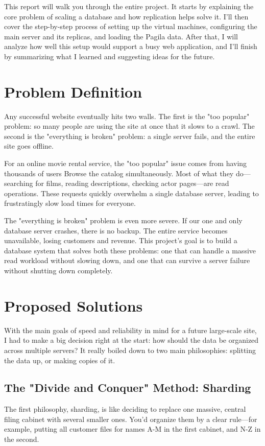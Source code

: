 \documentclass[conference]{IEEEtran}
\begin{document}
This report will walk you through the entire project. It starts by explaining the core problem of scaling a database and how replication helps solve it. I'll then cover the step-by-step process of setting up the virtual machines, configuring the main server and its replicas, and loading the Pagila data. After that, I will analyze how well this setup would support a busy web application, and I'll finish by summarizing what I learned and suggesting ideas for the future.
\section{Problem Definition}
Any successful website eventually hits two walls. The first is the "too popular" problem: so many people are using the site at once that it slows to a crawl. The second is the "everything is broken" problem: a single server fails, and the entire site goes offline.

For an online movie rental service, the "too popular" issue comes from having thousands of users Browse the catalog simultaneously. Most of what they do—searching for films, reading descriptions, checking actor pages—are read operations. These requests quickly overwhelm a single database server, leading to frustratingly slow load times for everyone.

The "everything is broken" problem is even more severe. If our one and only database server crashes, there is no backup. The entire service becomes unavailable, losing customers and revenue. This project's goal is to build a database system that solves both these problems: one that can handle a massive read workload without slowing down, and one that can survive a server failure without shutting down completely.

\section{Proposed Solutions}

With the main goals of speed and reliability in mind for a future large-scale site, I had to make a big decision right at the start: how should the data be organized across multiple servers? It really boiled down to two main philosophies: splitting the data up, or making copies of it.

\subsection{The "Divide and Conquer" Method: Sharding}
The first philosophy, sharding, is like deciding to replace one massive, central filing cabinet with several smaller ones. You'd organize them by a clear rule—for example, putting all customer files for names A-M in the first cabinet, and N-Z in the second.
\end{document}
